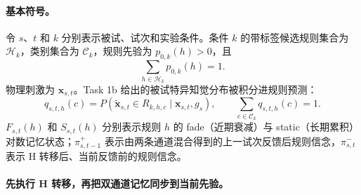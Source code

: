 \paragraph{基本符号。}
令 $s$、$t$ 和 $k$ 分别表示被试、试次和实验条件。条件 $k$ 的带标签候选规则集合为 $\mathcal H_k$，类别集合为 $\mathcal C_k$，规则先验为 $p_{0,k}(h)>0$，且
\begin{equation}
    \sum_{h\in\mathcal H_k}p_{0,k}(h)=1.
    \label{eq:model0803-rule-prior}
\end{equation}
物理刺激为 $\mathbf x_{s,t}$。Task 1b 给出的被试特异知觉分布被积分进规则预测：
\begin{equation}
    q_{s,t,h}(c)
    =P\!\left(
      \widetilde{\mathbf x}_{s,t}\in R_{k,h,c}
      \mid \mathbf x_{s,t},g_s
    \right),
    \qquad
    \sum_{c\in\mathcal C_k}q_{s,t,h}(c)=1.
    \label{eq:model0803-rule-prediction}
\end{equation}
$F_{s,t}(h)$ 和 $S_{s,t}(h)$ 分别表示规则 $h$ 的 fade（近期衰减）与 static（长期累积）对数记忆状态；$\pi^+_{s,t-1}$ 表示由两条通道混合得到的上一试次反馈后规则信念，$\pi^-_{s,t}$ 表示 H 转移后、当前反馈前的规则信念。

\paragraph{先执行 H 转移，再把双通道记忆同步到当前先验。}

